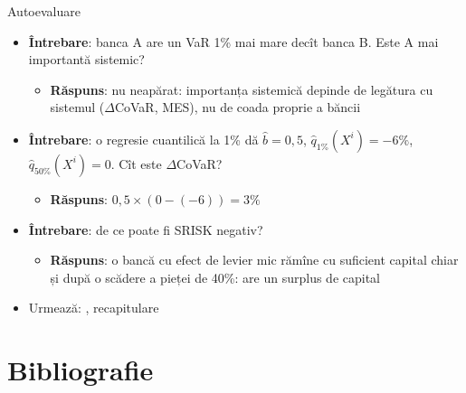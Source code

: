 \begin{frame}{Autoevaluare}
\itemsize{\small}
\begin{itemize}
    \item \textbf{Întrebare}: banca A are un VaR 1\% mai mare decît banca B. Este A mai importantă sistemic?
    \begin{itemize}
        \item \textbf{Răspuns}: nu neapărat: importanța sistemică depinde de legătura cu sistemul ($\Delta$CoVaR, MES), nu de coada proprie a băncii
    \end{itemize}
    \item \textbf{Întrebare}: o regresie cuantilică la 1\% dă $\hat b = 0{,}5$, $\hat q_{1\%}(X^i) = -6\%$, $\hat q_{50\%}(X^i) = 0$. Cît este $\Delta$CoVaR?
    \begin{itemize}
        \item \textbf{Răspuns}: $0{,}5 \times (0 - (-6)) = 3\%$
    \end{itemize}
    \item \textbf{Întrebare}: de ce poate fi SRISK negativ?
    \begin{itemize}
        \item \textbf{Răspuns}: o bancă cu efect de levier mic rămîne cu suficient capital chiar și după o scădere a pieței de 40\%: are un surplus de capital
    \end{itemize}
    \item Urmează: , recapitulare
\end{itemize}
\end{frame}


\section{Bibliografie}

